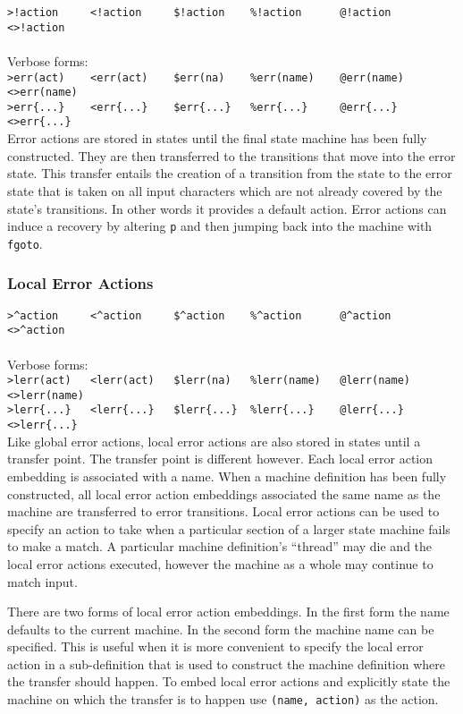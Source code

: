 \documentclass[letterpaper,11pt,oneside]{book}
\begin{document}
\noindent\verb|>!action     <!action     $!action    %!action      @!action      <>!action|\\
\\
\noindent Verbose forms:\\
\noindent\verb|>err(act)    <err(act)    $err(na)    %err(name)    @err(name)    <>err(name)|\\
\noindent\verb|>err{...}    <err{...}    $err{...}   %err{...}     @err{...}     <>err{...}|
\\

Error actions are stored in states until the final state machine has been fully
constructed. They are then transferred to the transitions that move into the
error state. This transfer entails the creation of a transition from the state
to the error state that is taken on all input characters which are not already
covered by the state's transitions. In other words it provides a default
action. Error actions can induce a recovery by altering \verb|p| and then jumping back
into the machine with \verb|fgoto|.

\subsubsection{Local Error Actions}

\noindent\verb|>^action     <^action     $^action    %^action      @^action      <>^action|\\
\\
\noindent Verbose forms:\\
\noindent\verb|>lerr(act)   <lerr(act)   $lerr(na)   %lerr(name)   @lerr(name)   <>lerr(name)|\\
\noindent\verb|>lerr{...}   <lerr{...}   $lerr{...}  %lerr{...}    @lerr{...}    <>lerr{...}|
\\

Like global error actions, local error actions are also stored in states until
a transfer point. The transfer point is different however. Each local error action
embedding is associated with a name. When a machine definition has been fully
constructed, all local error action embeddings associated the same name as the
machine are transferred to error transitions. Local error actions can be used
to specify an action to take when a particular section of a larger state
machine fails to make a match. A particular machine definition's ``thread'' may
die and the local error actions executed, however the machine as a whole may
continue to match input.

There are two forms of local error action embeddings. In the first form the name defaults
to the current machine. In the second form the machine name can be specified.  This
is useful when it is more convenient to specify the local error action in a
sub-definition that is used to construct the machine definition where the
transfer should happen. To embed local error actions and explicitly state the
machine on which the transfer is to happen use \verb|(name, action)| as the
action.
\end{document}

